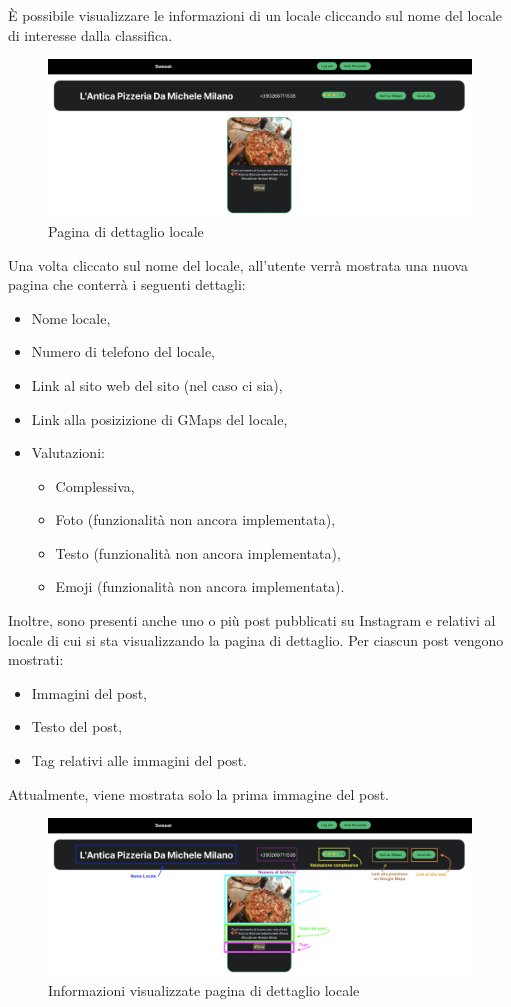 
È possibile visualizzare le informazioni di un locale cliccando sul nome del locale di interesse dalla classifica.

\begin{figure}[H]
\centering
\includegraphics[scale=0.3]{./images/DettagliLocale/DettagliLocale.png} 
\caption{Pagina di dettaglio locale}
\end{figure}

Una volta cliccato sul nome del locale, all’utente verrà mostrata una nuova pagina che conterrà i seguenti dettagli:

\begin{itemize}
\item Nome locale,
\item Numero di telefono del locale,
\item Link al sito web del sito (nel caso ci sia),
\item Link alla posizizione di GMaps del locale,
\item Valutazioni:
\begin{itemize}
\item Complessiva,
\item Foto (funzionalità non ancora implementata), 
\item Testo (funzionalità non ancora implementata),
\item Emoji (funzionalità non ancora implementata).
\end{itemize}
\end{itemize}

Inoltre, sono presenti anche uno o più post pubblicati su Instagram e relativi al locale di cui si sta visualizzando la pagina di dettaglio.
Per ciascun post vengono mostrati:

\begin{itemize}
\item Immagini del post,
\item Testo del post,
\item Tag relativi alle immagini del post.
\end{itemize}

Attualmente, viene mostrata solo la prima immagine del post.

\begin{figure}[H]
\centering
\includegraphics[scale=0.3]{./images/DettagliLocale/DettagliLocale2.png} 
\caption{Informazioni visualizzate pagina di dettaglio locale}
\end{figure}
